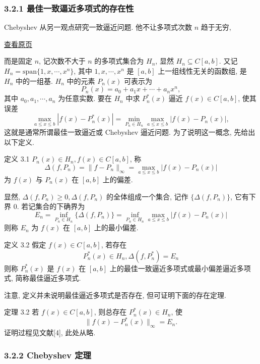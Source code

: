 \documentclass[
  10pt,
  fontset=fandol]{ctexart}
\begin{document}
\subsubsection{3.2.1 最佳一致逼近多项式的存在性}\label{ux6700ux4f73ux4e00ux81f4ux903cux8fd1ux591aux9879ux5f0fux7684ux5b58ux5728ux6027}

Chebyshev 从另一观点研究一致逼近问题. 他不让多项式次数 \(n\) 趋于无穷,

\href{../../source-images/pdf-061.jpeg}{查看原页}

而是固定 \(n\), 记次数不大于 \(n\) 的多项式集合为 \(H_n\), 显然 \(H_n \subseteq C[a,b]\). 又记 \(H_n = \text{span}\{1,x,\cdots,x^n\}\), 其中 \(1,x,\cdots,x^n\) 是 \([a,b]\) 上一组线性无关的函数组, 是 \(H_n\) 中的一组基. \(H_n\) 中的元素 \(P_n(x)\) 可表示为 \[
P_n(x) = a_0 + a_1x + \cdots + a_nx^n,
\] 其中 \(a_0,a_1,\cdots,a_n\) 为任意实数. 要在 \(H_n\) 中求 \(P_n^*(x)\) 逼近 \(f(x) \in C[a,b]\), 使其误差 \[
\max_{a \leqslant x \leqslant b} |f(x) - P_n^*(x)| = \min_{P_n \in H_n} \max_{a \leqslant x \leqslant b} |f(x) - P_n(x)|,
\] 这就是通常所谓最佳一致逼近或 Chebyshev 逼近问题. 为了说明这一概念, 先给出以下定义.

定义 3.1 \(P_n(x) \in H_n, f(x) \in C[a,b]\), 称 \[
\Delta(f,P_n) = \|f - P_n\|_\infty = \max_{a \leqslant x \leqslant b} |f(x) - P_n(x)| \tag{3.2.1}
\] 为 \(f(x)\) 与 \(P_n(x)\) 在 \([a,b]\) 上的偏差.

显然, \(\Delta(f,P_n) \geqslant 0, \Delta(f,P_n)\) 的全体组成一个集合, 记作 \(\{\Delta(f,P_n)\}\), 它有下界 0. 若记集合的下确界为 \[
E_n = \inf_{P_n \in H_n} \{\Delta(f,P_n)\} = \inf_{P_n \in H_n} \max_{a \leqslant x \leqslant b} |f(x) - P_n(x)| \tag{3.2.2}
\] 则称 \(E_n\) 为 \(f(x)\) 在 \([a,b]\) 上的最小偏差.

定义 3.2 假定 \(f(x) \in C[a,b]\), 若存在 \[
P_n^*(x) \in H_n, \Delta(f,P_n^*) = E_n \tag{3.2.3}
\] 则称 \(P_n^*(x)\) 是 \(f(x)\) 在 \([a,b]\) 上的最佳一致逼近多项式或最小偏差逼近多项式, 简称最佳逼近多项式.

注意, 定义并未说明最佳逼近多项式是否存在, 但可证明下面的存在定理.

定理 3.2 若 \(f(x) \in C[a,b]\), 则总存在 \(P_n^*(x) \in H_n\), 使 \[
\|f(x) - P_n^*(x)\|_\infty = E_n.
\] 证明过程见文献{[}4{]}, 此处从略.

\subsubsection{3.2.2 Chebyshev 定理}\label{chebyshev-ux5b9aux7406}
\end{document}

